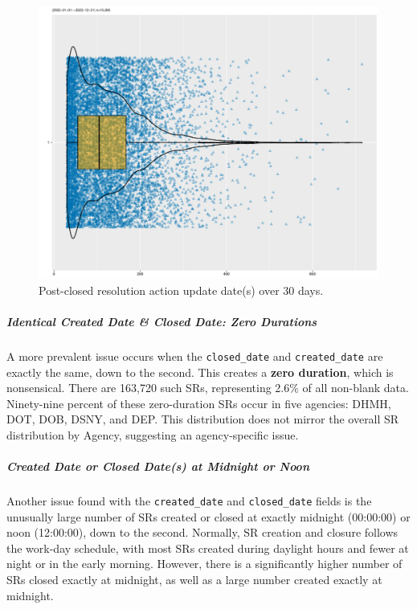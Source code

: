 \documentclass[linenumber]{jdsart}
\begin{document}
\begin{figure}[tbp]
  \centering
  \includegraphics[width=\textwidth]{post_closed_violin_chart.pdf}
  \caption{Post-closed resolution action update date(s) over 30 days.}
  \label{fig:resolution-violin}
\end{figure}

	
\subparagraph{Identical Created Date \& Closed Date: Zero Durations}
A more prevalent issue occurs when the \texttt{closed\_date} and 
\texttt{created\_date} are exactly the same, down to the second. This 
creates a \textbf{zero duration}, which is nonsensical. There 
are 163,720 such SRs, representing 2.6\% of all non-blank data. 
Ninety-nine percent of these zero-duration SRs occur in five agencies:
DHMH, DOT, DOB, DSNY, and DEP. This distribution does not 
mirror the overall SR distribution by Agency, suggesting 
an agency-specific issue.
	
		
\subparagraph{Created Date or Closed Date(s) at Midnight or Noon}
Another issue found with the \texttt{created\_date} and 
\texttt{closed\_date} fields is the unusually large number of SRs 
created or closed at exactly midnight (00:00:00) or noon (12:00:00), 
down to the second. Normally, SR creation and closure follows the 
work-day schedule, with most SRs created during daylight hours and 
fewer at night or in the early morning. However, there is a 
significantly higher number of SRs closed exactly at midnight, 
as well as a large number created exactly at midnight. 
\end{document}
